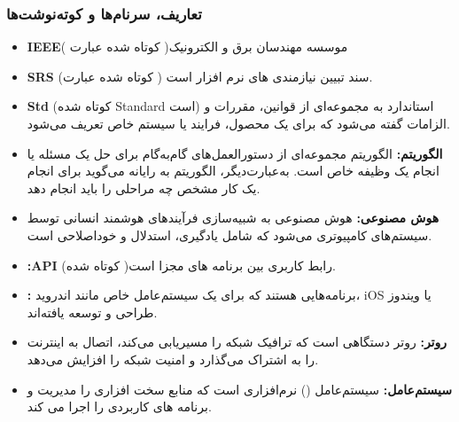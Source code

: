 \documentclass[12pt,a4paper,oneside]{article}
\begin{document}
			\subsubsection{تعاریف، سرنام‌ها و کوته‌نوشت‌ها}

			\begin{itemize}
				\item 
				\textbf{IEEE\rl{:}\label{ref:ieee}}( کوتاه شده عبارت
				)موسسه مهندسان برق و الکترونیک
		
				\item 
				\textbf{SRS\rl{:}\label{ref:srs}}
				(کوتاه شده عبارت 
				) 
				سند تبیین نیازمندی های نرم افزار است.
				
				\item
				\textbf{Std\rl{:}\label{ref:std}}
				(کوتاه شده Standard است)
				استاندارد به مجموعه‌ای از قوانین، مقررات و الزامات گفته می‌شود که برای یک محصول، فرایند یا سیستم خاص تعریف می‌شود.

				\item
					\textbf{الگوریتم:\label{ref:algorithm}}
					الگوریتم مجموعه‌ای از دستورالعمل‌های گام‌به‌گام برای حل یک مسئله یا انجام یک وظیفه خاص است. به‌عبارت‌دیگر، الگوریتم به رایانه می‌گوید برای انجام یک کار مشخص چه مراحلی را باید انجام دهد.

					\item 
					\textbf{هوش مصنوعی:\label{ref:ai}}
					هوش مصنوعی به شبیه‌سازی فرآیندهای هوشمند انسانی توسط سیستم‌های کامپیوتری می‌شود که شامل یادگیری، استدلال و خوداصلاحی است.

					\item 
					\textbf{:API\label{ref:api}}
					(کوتاه شده
					)رابط  کاربری بین برنامه های مجزا است.
					 \item 
					 \textbf{:\label{ref:nativeapp}} 
					 برنامه‌هایی هستند که برای یک سیستم‌عامل خاص مانند اندروید، iOS یا ویندوز طراحی و توسعه یافته‌اند.

					 \item 
					 \textbf{روتر:\label{ref:router}}
					  روتر دستگاهی است که ترافیک شبکه را مسیریابی می‌کند، اتصال به اینترنت را به اشتراک می‌گذارد و امنیت شبکه را افزایش می‌دهد.
					  
					  \item 
					  \textbf{سیستم‌عامل:\label{ref:os}}
					  سیستم‌عامل () نرم‌افزاری است که منابع سخت افزاری را مدیریت و برنامه های کاربردی را اجرا می کند.


\end{itemize}
\end{document}
